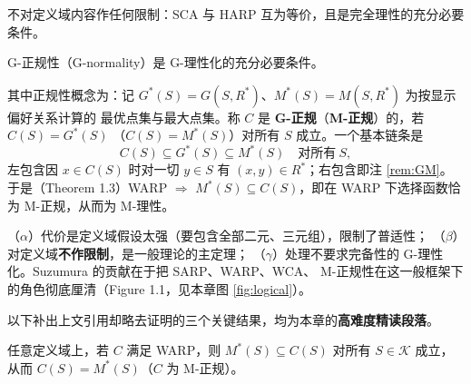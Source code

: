\begin{theorem}
不对定义域内容作任何限制：SCA 与 HARP 互为等价，且是完全理性的充分必要条件。
\end{theorem}

\begin{theorem}
G-正规性（G-normality）是 G-理性化的充分必要条件。
\end{theorem}

其中正规性概念为：记 $G^*(S)=G(S,R^*)$、$M^*(S)=M(S,R^*)$ 为按显示偏好关系计算的
最优点集与最大点集。称 $C$ 是 \textbf{G-正规}（\textbf{M-正规}）的，若 $C(S)=G^*(S)$
（$C(S)=M^*(S)$）对所有 $S$ 成立。一个基本链条是
\[
C(S)\subseteq G^*(S)\subseteq M^*(S) \quad\text{对所有}\ S,
\]
左包含因 $x\in C(S)$ 时对一切 $y\in S$ 有 $(x,y)\in R^*$；右包含即注 \ref{rem:GM}。
于是（Theorem 1.3）WARP $\Rightarrow$ $M^*(S)\subseteq C(S)$，即在 WARP 下选择函数恰为
M-正规，从而为 M-理性。

\begin{remark}[三大结果的分工]
（$\alpha$）代价是定义域假设太强（要包含全部二元、三元组），限制了普适性；
（$\beta$）对定义域\textbf{不作限制}，是一般理论的主定理；
（$\gamma$）处理不要求完备性的 G-理性化。Suzumura 的贡献在于把 SARP、WARP、WCA、
M-正规性在这一般框架下的角色彻底厘清（Figure 1.1，见本章图 \ref{fig:logical}）。
\end{remark}

以下补出上文引用却略去证明的三个关键结果，均为本章的\textbf{高难度精读段落}。

\begin{theorem}\label{thm:13}
任意定义域上，若 $C$ 满足 WARP，则 $M^*(S)\subseteq C(S)$ 对所有 $S\in\mathcal{K}$
成立，从而 $C(S)=M^*(S)$（$C$ 为 M-正规）。
\end{theorem}

